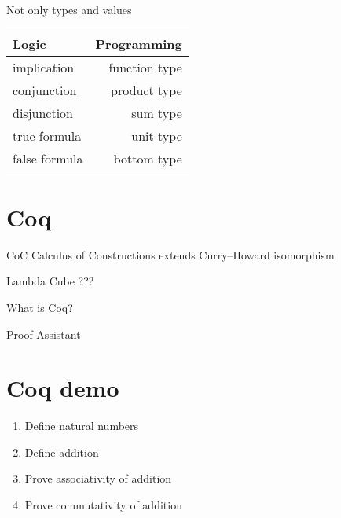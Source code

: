 \documentclass[17pt]{beamer}
\begin{document}
\begin{frame}{Not only types and values}
\begin{table}
\begin{tabular}{ l | r }
Logic & Programming \\
\hline \hline
implication 	& function type \\
conjunction 	& product type \\
disjunction 	& sum type \\
true formula 	& unit type \\
false formula 	& bottom type \\
\end{tabular}
\end{table}
\end{frame}

\section{Coq}

\begin{frame}{CoC}
Calculus of Constructions extends Curry–Howard isomorphism
\end{frame}

\begin{frame}{Lambda Cube}
???
\end{frame}

\begin{frame}{What is Coq?}
\begin{center}
Proof Assistant
\end{center}
\end{frame}

\section{Coq demo}

\begin{frame}
	\begin{enumerate}
		\item Define natural numbers
		\item Define addition
		\item Prove associativity of addition
		\item Prove commutativity of addition 
	\end{enumerate}
\end{frame}
\end{document}
